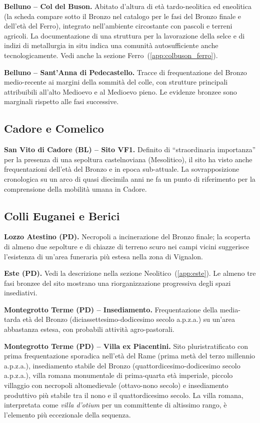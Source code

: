 \textbf{Belluno -- Col del Buson.} \label{app:colbuson} Abitato d'altura di età tardo-neolitica ed eneolitica (la scheda compare sotto il Bronzo nel catalogo per le fasi del Bronzo finale e dell'età del Ferro), integrato nell'ambiente circostante con pascoli e terreni agricoli. La documentazione di una struttura per la lavorazione della selce e di indizi di metallurgia in situ indica una comunità autosufficiente anche tecnologicamente. Vedi anche la sezione Ferro~(\ref{app:colbuson_ferro}).

\textbf{Belluno -- Sant'Anna di Pedecastello.} Tracce di frequentazione del Bronzo medio-recente ai margini della sommità del colle, con strutture principali attribuibili all'alto Medioevo e al Medioevo pieno. Le evidenze bronzee sono marginali rispetto alle fasi successive.

\subsection{Cadore e Comelico}

\textbf{San Vito di Cadore (BL) -- Sito VF1.} Definito di ``straordinaria importanza'' per la presenza di una sepoltura castelnoviana (Mesolitico), il sito ha visto anche frequentazioni dell'età del Bronzo e in epoca sub-attuale. La sovrapposizione cronologica su un arco di quasi diecimila anni ne fa un punto di riferimento per la comprensione della mobilità umana in Cadore.

\subsection{Colli Euganei e Berici}

\textbf{Lozzo Atestino (PD).} Necropoli a incinerazione del Bronzo finale; la scoperta di almeno due sepolture e di chiazze di terreno scuro nei campi vicini suggerisce l'esistenza di un'area funeraria più estesa nella zona di Vignalon.

\textbf{Este (PD).} \label{app:este_bronzo} Vedi la descrizione nella sezione Neolitico~(\ref{app:este}). Le almeno tre fasi bronzee del sito mostrano una riorganizzazione progressiva degli spazi insediativi.

\textbf{Montegrotto Terme (PD) -- Insediamento.} Frequentazione della media-tarda età del Bronzo (diciassettesimo-dodicesimo secolo a.p.z.a.) su un'area abbastanza estesa, con probabili attività agro-pastorali.

\textbf{Montegrotto Terme (PD) -- Villa ex Piacentini.} \label{app:montegrotto} Sito pluristratificato con prima frequentazione sporadica nell'età del Rame (prima metà del terzo millennio a.p.z.a.), insediamento stabile del Bronzo (quattordicesimo-dodicesimo secolo a.p.z.a.), villa romana monumentale di prima-quarta età imperiale, piccolo villaggio con necropoli altomedievale (ottavo-nono secolo) e insediamento produttivo più stabile tra il nono e il quattordicesimo secolo. La villa romana, interpretata come \textit{villa d'otium} per un committente di altissimo rango, è l'elemento più eccezionale della sequenza.

